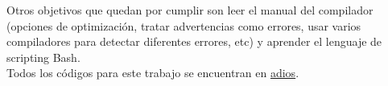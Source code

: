 \documentclass[a4paper,12pt]{article}
\begin{document}
Otros objetivos que quedan por cumplir son leer el manual del compilador (opciones de optimización, tratar advertencias como errores, usar varios compiladores para detectar diferentes errores, etc) y aprender el lenguaje de scripting Bash.\\

Todos los códigos para este trabajo se encuentran en \href{hola}{adios}.




\end{document}
